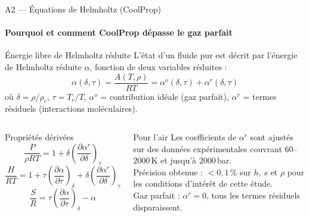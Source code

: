 \documentclass[aspectratio=43, 10pt]{beamer}
\begin{document}
\begin{frame}{A2 --- \'Equations de Helmholtz (CoolProp)}
  \framesubtitle{Pourquoi et comment CoolProp d\'epasse le gaz parfait}

  \begin{block}{\'Energie libre de Helmholtz r\'eduite}
    \small
    L'\'etat d'un fluide pur est d\'ecrit par l'\'energie de Helmholtz
    r\'eduite $\alpha$, fonction de deux variables r\'eduites :
    \[
      \alpha(\delta, \tau)
      = \frac{A(T,\rho)}{RT}
      = \alpha^o(\delta,\tau) + \alpha^r(\delta,\tau)
    \]
    \vspace{-6pt}
    o\`u $\delta = \rho/\rho_c$, $\tau = T_c/T$,
    $\alpha^o$ = contribution id\'eale (gaz parfait),
    $\alpha^r$ = termes r\'esiduels (interactions mol\'eculaires).
  \end{block}

  \begin{columns}[T,onlytextwidth]
      \begin{block}{Propri\'et\'es d\'eriv\'ees}
        \small
        \vspace{-2pt}
        \[
          \frac{P}{\rho RT}
          = 1 + \delta\!\left(\frac{\partial\alpha^r}{\partial\delta}\right)_{\!\tau}
        \]
        \vspace{-8pt}
        \[
          \frac{H}{RT}
          = 1 + \tau\!\left(\frac{\partial\alpha}{\partial\tau}\right)_{\!\delta}
            + \delta\!\left(\frac{\partial\alpha^r}{\partial\delta}\right)_{\!\tau}
        \]
        \vspace{-8pt}
        \[
          \frac{S}{R}
          = \tau\!\left(\frac{\partial\alpha}{\partial\tau}\right)_{\!\delta}
            - \alpha
        \]
      \end{block}

      \begin{exampleblock}{Pour l'air}
        \small
        Les coefficients de $\alpha^r$ sont ajust\'es
        sur des donn\'ees exp\'erimentales couvrant
        $60$--$2000$\,K et jusqu'\`a $2000$\,bar.\\[4pt]
        Pr\'ecision obtenue : $< 0{,}1\,\%$ sur
        $h$, $s$ et $\rho$ pour les conditions
        d'int\'er\^et de cette \'etude.\\[4pt]
        Gaz parfait : $\alpha^r = 0$,
        tous les termes r\'esiduels disparaissent.
      \end{exampleblock}
  \end{columns}

\end{frame}
\end{document}
